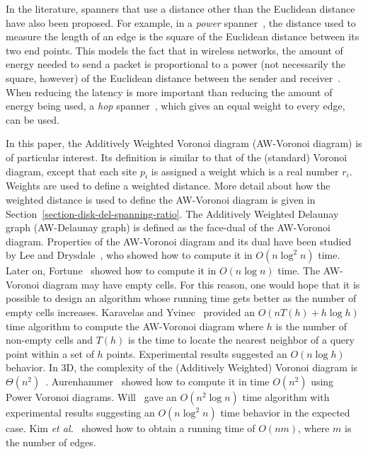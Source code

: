 \documentclass[pdftex,leqno,fleqn,12pt]{article}
\newcommand{\etal}{\textit{et al.}}
\begin{document}
In the literature, spanners that use a distance other than the Euclidean distance have also been
proposed. For example, in a \emph{power}
spanner~\cite{aurenhammer87,li01,grunewald02,schindelhauer04}, the distance used to measure the
length of an edge is the square of the Euclidean distance between its two end points. This models
the fact that in wireless networks, the amount of energy needed to send a packet is proportional to
a power (not necessarily the square, however) of the Euclidean distance between the sender and
receiver~\cite{pahlavan95}. When reducing the latency is more important than reducing the amount of
energy being used, a \emph{hop} spanner~\cite{alzoubi03}, which gives an equal weight to every
edge, can be used.

In this paper, the Additively Weighted Voronoi diagram (AW-Voronoi diagram) is
of particular interest.
Its definition is similar to that of the (standard) Voronoi diagram, except
that each site $p_i$ is assigned a weight which is a real number $r_i$.
Weights are used to define a weighted distance. More detail about how the
weighted distance is used to define the AW-Voronoi diagram is given in
Section~\ref{section-disk-del-spanning-ratio}. The Additively Weighted Delaunay
graph (AW-Delaunay graph) is defined as the face-dual of the AW-Voronoi
diagram. Properties of the AW-Voronoi diagram and its dual have been studied by
Lee and Drysdale~\cite{drysdale81}, who showed how to compute it in $O(n\log^2
n)$ time. Later on, Fortune~\cite{fortune87} showed how to compute it in
$O(n\log n)$ time. The AW-Voronoi diagram may have empty cells. For this
reason, one would hope that it is possible to design an algorithm whose running
time gets better as the number of empty cells increases. Karavelas and
Yvinec~\cite{karavelas02} provided an $O(nT(h)+h\log h)$ time algorithm to
compute the AW-Voronoi diagram where $h$ is the number of non-empty cells and
$T(h)$ is the time to locate the nearest neighbor of a query point within a set
of $h$ points.  Experimental results suggested an $O(n\log h)$ behavior. In 3D,
the complexity of the (Additively Weighted) Voronoi diagram is
$\Theta(n^2)$~\cite{klee80}. Aurenhammer~\cite{aurenhammer87} showed how to
compute it in time $O(n^2)$ using Power Voronoi diagrams. Will~\cite{will98}
gave an $O(n^2\log n)$ time algorithm with experimental results suggesting an
$O(n\log^2 n)$ time behavior in the expected case. Kim \etal~\cite{kim05}
showed how to obtain a running time of $O(nm)$, where $m$ is the number of
edges.
\end{document}
